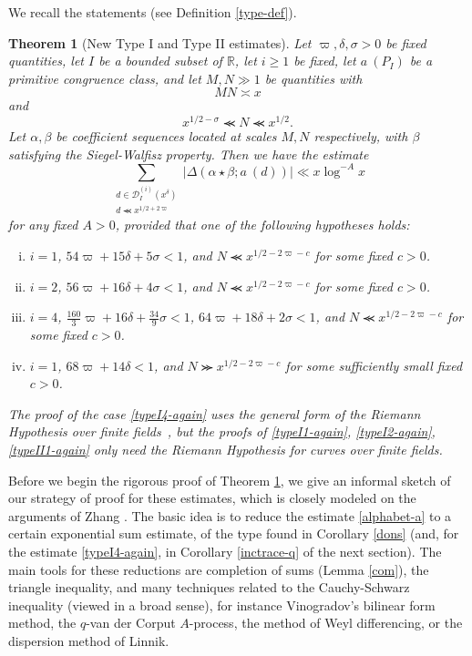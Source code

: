 \documentclass[12pt,a4paper,reqno]{amsart}
\numberwithin{equation}{section}
\theoremstyle{plain}
\newtheorem{theorem}{Theorem}[section]
\theoremstyle{definition}
\newcommand\R{\mathbb{R}}
\newcommand{\DI}[3]{\mathcal{D}_{{#1}}^{({#2})}({#3})}
\renewcommand{\sim}{\asymp}
\renewcommand{\lessapprox}{\llcurly}
\renewcommand{\gtrapprox}{\ggcurly}
\begin{document}
We recall the statements (see Definition \ref{type-def}).

\begin{theorem}[New Type I and Type II estimates]\label{newtype-i-ii}
  Let $\varpi,\delta,\sigma > 0$ be fixed quantities, let $I$ be a
  bounded subset of $\R$, let $i\geq 1$ be fixed, let $a\ (P_I)$ be a
  primitive congruence class, and let $M,N \gg 1$ be quantities with
\begin{equation}\label{lin-2}
MN \sim x
\end{equation}
and
\begin{equation}\label{slop}
 x^{1/2-\sigma} \lessapprox N \lessapprox x^{1/2}.
\end{equation}
Let $\alpha,\beta$ be coefficient sequences located at scales $M,N$
respectively, with $\beta$ satisfying the Siegel-Walfisz property.
Then we have the estimate
\begin{equation}\label{alphabet-a}
  \sum_{\substack{d \in \DI{I}{i}{x^\delta}\\ d \lessapprox x^{1/2+2\varpi}}} |\Delta(\alpha \star \beta; a\ (d))|
  \ll x \log^{-A} x
\end{equation}
for any fixed $A>0$, provided that one of the following
hypotheses holds:
\begin{enumerate}[(i)]
\item\label{typeI1-again} $i=1$, $54\varpi + 15\delta + 5 \sigma < 1$, and $N \lessapprox x^{1/2-2\varpi-c}$ for some fixed $c>0$.
\item\label{typeI2-again} $i=2$, $56\varpi + 16\delta + 4 \sigma < 1$, and $N \lessapprox x^{1/2-2\varpi-c}$ for some fixed $c>0$.
\item\label{typeI4-again} $i=4$, $\frac{160}{3} \varpi + 16\delta + \frac{34}{9} \sigma < 1$, $64\varpi + 18 \delta + 2\sigma < 1$, and $N \lessapprox x^{1/2-2\varpi-c}$ for some fixed $c>0$.
\item\label{typeII1-again} $i=1$, $68\varpi + 14 \delta < 1$, and $N \gtrapprox x^{1/2-2\varpi-c}$ for some sufficiently small fixed $c>0$.
\end{enumerate}
The proof of the case \eqref{typeI4-again} uses the general form
of the Riemann Hypothesis over finite fields~\cite{WeilII}, but the
proofs of \eqref{typeI1-again}, \eqref{typeI2-again},
\eqref{typeII1-again} only need the Riemann Hypothesis for curves over
finite fields.
\end{theorem}

Before we begin the rigorous proof of Theorem \ref{newtype-i-ii}, we
give an informal sketch of our strategy of proof for these estimates,
which is closely modeled on the arguments of Zhang \cite{zhang}.  The
basic idea is to reduce the estimate \eqref{alphabet-a} to a certain
exponential sum estimate, of the type found in Corollary \ref{dons} (and,
for the estimate \eqref{typeI4-again}, in Corollary \ref{inctrace-q} of
the next section).  The main tools for these reductions are completion
of sums (Lemma \ref{com}), the triangle inequality, and many
techniques related to the Cauchy-Schwarz inequality (viewed in a broad
sense), for instance Vinogradov's bilinear form method, the $q$-van
der Corput $A$-process, the method of Weyl differencing, or the
dispersion method of Linnik.
\end{document}
